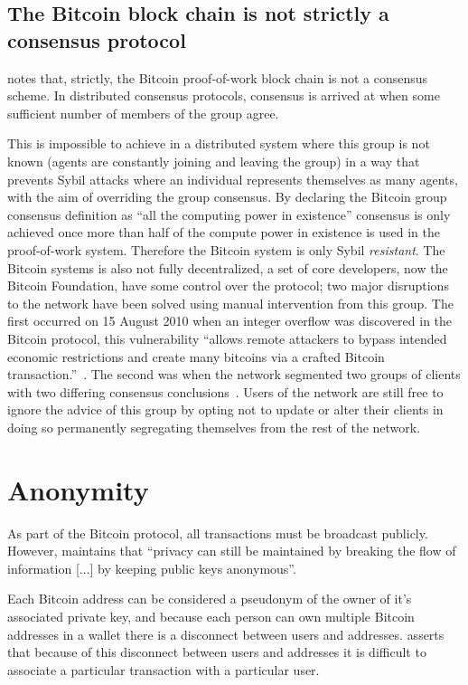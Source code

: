 \subsection{The Bitcoin block chain is not strictly a consensus protocol}
\textcite{bitcoin-impossible} notes that, strictly, the Bitcoin proof-of-work block chain is not a consensus scheme. In distributed consensus protocols, consensus is arrived at when some sufficient number of members of the group agree.

This is impossible to achieve in a distributed system where this group is not known (agents are constantly joining and leaving the group) in a way that prevents Sybil attacks\cite{sybil} where an individual represents themselves as many agents, with the aim of overriding the group consensus.  By declaring the Bitcoin group consensus definition as ``all the computing power in existence'' consensus is only achieved once more than half of the compute power in existence is used in the proof-of-work system. Therefore the Bitcoin system is only Sybil \emph{resistant}. The Bitcoin systems is also not fully decentralized, a set of core developers, now the Bitcoin Foundation, have some control over the protocol; two major disruptions to the network have been solved using manual intervention from this group.  The first occurred on 15 August 2010 when an integer overflow was discovered in the Bitcoin protocol, this vulnerability ``allows remote attackers to bypass intended economic restrictions and create many bitcoins via a crafted Bitcoin transaction.''~\cite{CVE-2010-5139}. The second was when the network segmented two groups of clients with two differing consensus conclusions~\cite{CVE-2013-3220,glitch-report,major-glitch}.  Users of the network are still free to ignore the advice of this group by opting not to update or alter their clients in doing so permanently segregating themselves from the rest of the network.

\section{Anonymity}
As part of the Bitcoin protocol, all transactions must be broadcast publicly.  However, \textcite{satoshi} maintains that ``privacy can still be maintained by breaking the flow of information [...] by keeping public keys anonymous''.

Each Bitcoin address can be considered a pseudonym of the owner of it's associated private key, and because each person can own multiple Bitcoin addresses in a wallet there is a disconnect between users and addresses. \textcite{satoshi} asserts that because of this disconnect between users and addresses it is difficult to associate a particular transaction with a particular user.

